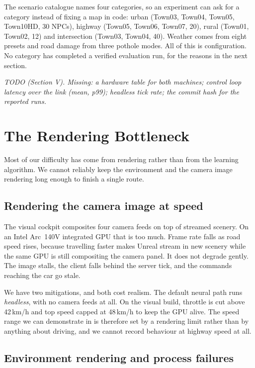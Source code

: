 \documentclass[conference]{IEEEtran}
\newcommand{\TODO}[1]{%
  \begingroup
  \setlength{\FrameSep}{4pt}%
  \def\FrameCommand{{\color{gray!55}\vrule width 1.2pt}\hspace{5pt}}%
  \MakeFramed{\advance\hsize-\width \FrameRestore}%
  \noindent\scriptsize\itshape\color{gray!80}#1%
  \endMakeFramed
  \endgroup}
\begin{document}
The scenario catalogue names four categories, so an experiment can ask
for a category instead of fixing a map in code: urban (Town03, Town04,
Town05, Town10HD, 30 NPCs), highway (Town05, Town06, Town07, 20), rural
(Town01, Town02, 12) and intersection (Town03, Town04, 40). Weather
comes from eight presets and road damage from three pothole modes. All
of this is configuration. No category has completed a verified
evaluation run, for the reasons in the next section.

\TODO{TODO (Section V). Missing: a hardware table for both machines;
control loop latency over the link (mean, p99); headless tick rate; the
commit hash for the reported runs.}

\section{The Rendering Bottleneck}

Most of our difficulty has come from rendering rather than from the
learning algorithm. We cannot reliably keep the environment and the
camera image rendering long enough to finish a single route.

\subsection{Rendering the camera image at speed}

The visual cockpit composites four camera feeds on top of streamed
scenery. On an Intel Arc~140V integrated GPU that is too much. Frame
rate falls as road speed rises, because travelling faster makes Unreal
stream in new scenery while the same GPU is still compositing the camera
panel. It does not degrade gently. The image stalls, the client falls
behind the server tick, and the commands reaching the car go stale.

We have two mitigations, and both cost realism. The default neural path
runs \emph{headless}, with no camera feeds at all. On the visual build,
throttle is cut above 42\,km/h and top speed capped at 48\,km/h to keep
the GPU alive. The speed range we can demonstrate in is therefore set by
a rendering limit rather than by anything about driving, and we cannot
record behaviour at highway speed at all.

\subsection{Environment rendering and process failures}
\end{document}
